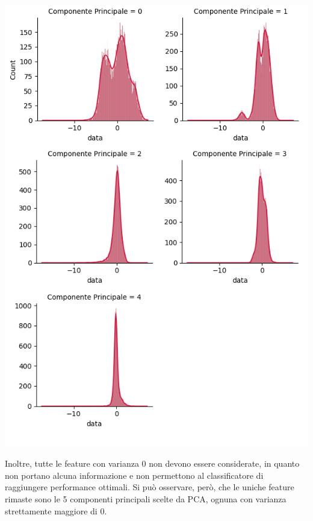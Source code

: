 \begin{Figure}
    \centering
    \includegraphics[width=\linewidth]{img/components_distribution.png}
\end{Figure}

Inoltre, tutte le feature con varianza 0 non devono essere considerate, in quanto
non portano alcuna informazione e non permettono al classificatore di 
raggiungere performance ottimali. Si può osservare, però, che le uniche feature
rimaste sono le 5 componenti principali scelte da PCA, ognuna con varianza
strettamente maggiore di 0.

